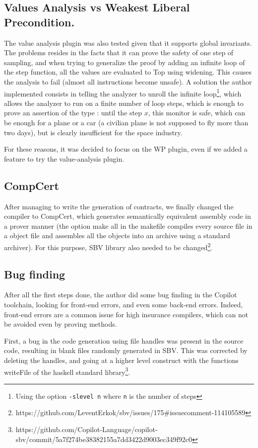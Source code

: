 \documentclass[a4paper,11pt,final]{article}
\begin{document}
	\subsection{Values Analysis vs Weakest Liberal Precondition.}
	The value analysis plugin was also tested given that it supports global invariants. The problems resides in the facts that it can prove the safety of one step of sampling, and when trying to generalize the proof by adding an infinite loop of the step function, all the values are evaluated to Top using widening. This causes the analysis to fail (almost all instructions become unsafe). A solution the author implemented consists in telling the analyzer to unroll the infinite loop\footnote{Using the option \texttt{-slevel n} where \texttt{n} is the number of steps}, which allows the analyzer to run on a finite number of loop steps, which is enough to prove an assertion of the type : until the step $x$, this monitor is safe, which can be enough for a plane or a car (a civilian plane is not supposed to fly more than two days), but is clearly insufficient for the space industry.
	
	For these reasons, it was decided to focus on the WP plugin, even if we added a feature to try the value-analysis plugin.
	\subsection{CompCert}
	
	After managing to write the generation of contracts, we finally changed the compiler to CompCert, which generates semantically equivalent assembly code in a prover manner (the option make all in the makefile compiles every source file in a object file and assembles all the objects into an archive using a standard archiver). For this purpose, SBV library also needed to be changed\footnote{https://github.com/LeventErkok/sbv/issues/175\#issuecomment-114105589}.
	
	\subsection{Bug finding}
	After all the first steps done, the author did some bug finding in the Copilot toolchain, looking for front-end errors, and even some back-end errors. Indeed, front-end errors are a common issue for high insurance compilers, which can not be avoided even by proving methods\cite{bugC}. 
	
	First, a bug in the code generation using file handles was present in the source code, resulting in blank files randomly generated in SBV. This was corrected by deleting the handles, and going at a higher level construct with the functions writeFile of the haskell standard library\footnote{https://github.com/Copilot-Language/copilot-sbv/commit/5a7f274be38382155a7dd3422d9003ec349f92c0}. 
	
\end{document}
